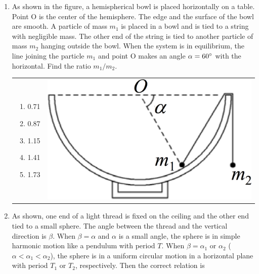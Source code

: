 \documentclass[12pt,letterpaper]{article}
\begin{document}
\begin{enumerate}
\item
As shown in the figure, a hemispherical bowl is placed horizontally on a table. Point O is the center of the hemisphere. The edge and the surface of the bowl are smooth. A particle of mass $m_1$ is placed in a bowl and is tied to a string with negligible mass. The other end of the string is tied to another particle of mass $m_2$ hanging outside the bowl. When the system is in equilibrium, the line joining the particle $m_1$ and point O makes an angle $\alpha = 60\degree$ with the horizontal. Find the ratio $m_1/m_2$.

\begin{tabular}{l r}

\begin{minipage}{0.6\textwidth}
\begin{enumerate}
\item 0.71
\item 0.87
\item 1.15
\item 1.41
\item 1.73
\end{enumerate}
\end{minipage} &
\begin{minipage}{0.3\textwidth}
\includegraphics[width=\textwidth]{bowl.png}
\end{minipage}
\end{tabular}

\item
As shown, one end of a light thread is fixed on the ceiling and the other end tied to a small sphere. The angle between the thread and the vertical direction is $\beta$. When $\beta = \alpha$ and $\alpha$ is a small angle, the sphere is in simple harmonic motion like a pendulum with period $T$. When $\beta = \alpha_1$ or $\alpha_2$ ($\alpha < \alpha_1 < \alpha_2$), the sphere is in a uniform circular motion in a horizontal plane with period $T_1$ or $T_2$, respectively. Then the correct relation is


\end{enumerate}
\end{document}
